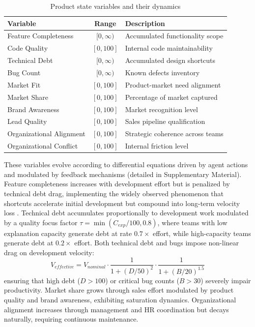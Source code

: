 \documentclass[alpha-refs]{wiley-article}
\begin{document}
\begin{table}[!htbp]
\centering
\caption{Product state variables and their dynamics}
\label{tab:product_vars}
\begin{tabular}{|l|c|p{6cm}|}
\hline
\textbf{Variable} & \textbf{Range} & \textbf{Description} \\
\hline
Feature Completeness & $[0, \infty)$ & Accumulated functionality scope \\
Code Quality & $[0, 100]$ & Internal code maintainability \\
Technical Debt & $[0, \infty)$ & Accumulated design shortcuts \\
Bug Count & $[0, \infty)$ & Known defects inventory \\
Market Fit & $[0, 100]$ & Product-market need alignment \\
Market Share & $[0, 100]$ & Percentage of market captured \\
Brand Awareness & $[0, 100]$ & Market recognition level \\
Lead Quality & $[0, 100]$ & Sales pipeline qualification \\
Organizational Alignment & $[0, 100]$ & Strategic coherence across teams \\
Organizational Conflict & $[0, 100]$ & Internal friction level \\
\hline
\end{tabular}
\end{table}

These variables evolve according to differential equations driven by agent actions and modulated by feedback mechanisms (detailed in Supplementary Material). Feature completeness increases with development effort but is penalized by technical debt drag, implementing the widely observed phenomenon that shortcuts accelerate initial development but compound into long-term velocity loss \cite{franco2023systems}. Technical debt accumulates proportionally to development work modulated by a quality focus factor $\tau = \min(C_{exp}/100, 0.8)$, where teams with low explanation capacity generate debt at rate $0.7 \times$ effort, while high-capacity teams generate debt at $0.2 \times$ effort. Both technical debt and bugs impose non-linear drag on development velocity:
\begin{equation}
  V_{effective} = V_{nominal} \cdot \frac{1}{1 + (D/50)^2} \cdot \frac{1}{1 + (B/20)^{1.5}}
\end{equation}
ensuring that high debt ($D > 100$) or critical bug counts ($B > 30$) severely impair productivity. Market share grows through sales effort modulated by product quality and brand awareness, exhibiting saturation dynamics. Organizational alignment increases through management and HR coordination but decays naturally, requiring continuous maintenance.
\end{document}
